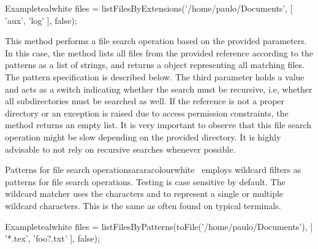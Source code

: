 \begin{description}
\begin{codebox}{Example}{teal}{\icnote}{white}
files = listFilesByExtensions('/home/paulo/Documents',
        [ 'aux', 'log' ], false);
\end{codebox}

\item[\mdbox{R}{\parbox{0.59\textwidth}{listFilesByPatterns(File file,\\\hspace*{1em} List<String> patterns, boolean recursive)}}{List<File>}] This method performs a file search operation based on the provided parameters. In this case, the method lists all files from the provided  reference according to the  patterns as a list of strings, and returns a  object representing all matching files. The pattern specification is described below. The third parameter holds a  value and acts as a switch indicating whether the search must be recursive, i.e, whether all subdirectories must be searched as well. If the reference is not a proper directory or an exception is raised due to access permission constraints, the  method returns an empty list. It is very important to observe that this file search operation might be slow depending on the provided directory. It is highly advisable to not rely on recursive searches whenever possible.

\begin{messagebox}{Patterns for file search operations}{araracolour}{\icattention}{white}
\arara\ employs wildcard filters as patterns for file search operations. Testing is case sensitive by default. The wildcard matcher uses the characters  and \rbox[araracolour]{*} to represent a single or multiple wildcard characters. This is the same as often found on typical terminals.
\end{messagebox}

\begin{codebox}{Example}{teal}{\icnote}{white}
files = listFilesByPatterns(toFile('/home/paulo/Documents'),
        [ '*.tex', 'foo?.txt' ], false);
\end{codebox}



\end{description}
